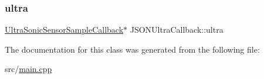 \subsubsection{\texorpdfstring{ultra}{ultra}}
{\footnotesize\ttfamily \hyperlink{classUltraSonicSensorSampleCallback}{Ultra\+Sonic\+Sensor\+Sample\+Callback}$\ast$ J\+S\+O\+N\+Ultra\+Callback\+::ultra\hspace{0.3cm}{\ttfamily [private]}}



The documentation for this class was generated from the following file\+:\begin{DoxyCompactItemize}
\item 
src/\hyperlink{main_8cpp}{main.\+cpp}\end{DoxyCompactItemize}
